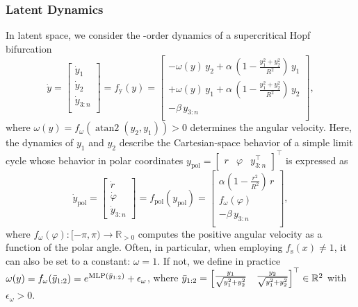 \subsubsection{Latent Dynamics}
In latent space, we consider the -order dynamics of a supercritical Hopf bifurcation~\citep{strogatz2018nonlinear, khadivar2021learning, zhi2024teaching, nah2025combining}
\begin{equation}\label{eq:osmp:latent_dynamics}
    \dot{y} = \begin{bmatrix}
        \dot{y}_1\\
        \dot{y}_2\\
        \dot{y}_{3:n}\\
    \end{bmatrix} = f_\mathrm{y}(y) = \begin{bmatrix}
        -\omega(y) \, y_2 + \alpha \, \left ( 1 - \frac{y_1^2 + y_2^2}{R^2} \right ) \, y_1\\
        + \omega(y) \, y_1 + \alpha \, \left ( 1 - \frac{y_1^2 + y_2^2}{R^2} \right ) \, y_2\\
        -\beta \, y_{3:n}\\
    \end{bmatrix},
\end{equation}
where $\omega(y) = f_\omega(\operatorname{atan2}(y_2, y_1)) > 0$ determines the angular velocity.
Here, the dynamics of $y_1$ and $y_2$ describe the Cartesian-space behavior of a simple limit cycle whose behavior in polar coordinates $y_\mathrm{pol} = \begin{bmatrix}
    r & \varphi & y_{3:n}^\top
\end{bmatrix}^\top$ is expressed as
\begin{equation}\label{eq:osmp:latent_dynamics_polar_coordinates}
    \dot{y}_\mathrm{pol} = \begin{bmatrix}
        \dot{r}\\ \dot{\varphi}\\ \dot{y}_{3:n}
    \end{bmatrix} = f_\mathrm{pol}(y_\mathrm{pol}) = \begin{bmatrix}
        \alpha \left ( 1 - \frac{r^2}{R^2} \right ) \, r\\ f_\omega(\varphi)\\ -\beta \, y_{3:n}\\
    \end{bmatrix},
\end{equation}
where $f_\omega(\varphi): [-\pi, \pi) \to \mathbb{R}_{>0}$ computes the positive angular velocity as a function of the polar angle. Often, in particular, when employing $f_\mathrm{s}(x) \neq 1$, it can also be set to a constant: $\omega = 1$. 
If not, we define in practice $\omega(y) = f_\omega(\Bar{y}_{1:2}) = e^{\mathrm{MLP}(\Bar{y}_{1:2})} + \epsilon_\omega$, where $\Bar{y}_{1:2} = \begin{bmatrix}
    \frac{y_1}{\sqrt{y_1^2+y_2^2}} &  \frac{y_2}{\sqrt{y_1^2+y_2^2}}
\end{bmatrix}^\top \in \mathbb{R}^2$ with $\epsilon_\omega > 0$.

